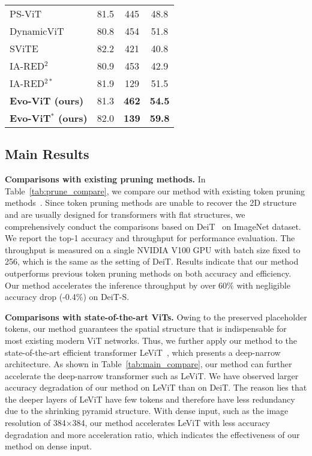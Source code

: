 \documentclass[letterpaper]{article} \usepackage{aaai22}  \usepackage{times}  \usepackage{helvet}  \usepackage{courier}  \usepackage[hyphens]{url}  \usepackage{graphicx} \urlstyle{rm} \def\UrlFont{\rm}  \usepackage{natbib}  \usepackage{caption} \DeclareCaptionStyle{ruled}{labelfont=normalfont,labelsep=colon,strut=off} \frenchspacing  \setlength{\pdfpagewidth}{8.5in}  \setlength{\pdfpageheight}{11in}  \usepackage{algorithm}
\begin{document}
\begin{table}
{{\begin{tabular}{l|ccc}
    PS-ViT~\cite{PatchSlimming}     &      81.5       &                445        &       48.8      \\
    DynamicViT~\cite{DynamicViT}    &      80.8       &                454        &       51.8      \\
    SViTE~\cite{SViTE}              &      82.2   &                 421        &       40.8      \\
    IA-RED$^2$~\cite{IA-RED2}       &      80.9       &                453        &       42.9      \\
    IA-RED$^{2*}$~\cite{IA-RED2}    &      81.9       &                129        &       51.5      \\
    \textbf{Evo-ViT (ours) }        &      81.3       &      \textbf{462}        &       \textbf{54.5} \\
    \textbf{Evo-ViT$^{*}$ (ours)}   &      82.0       &                \textbf{139}        &       \textbf{59.8}      \\
    \bottomrule
    \end{tabular}
    }
    }
    \vspace{-3mm}
\end{table} 
\subsection{Main Results}
\noindent\textbf{Comparisons with existing pruning methods.}
In Table~\ref{tab:prune_compare}, we compare our method with existing token pruning methods~\cite{DynamicViT,IA-RED2,PatchSlimming,SViTE}. Since token pruning methods are unable to recover the 2D structure and are usually designed for transformers with flat structures, we comprehensively conduct the comparisons based on DeiT~\cite{DeiT} on ImageNet dataset. We report the top-1 accuracy and throughput for performance evaluation. The throughput is measured on a single NVIDIA V100 GPU with batch size fixed to 256, which is the same as the setting of DeiT. Results indicate that our method outperforms previous token pruning methods on both accuracy and efficiency. Our method accelerates the inference throughput by over 60$\%$ with negligible accuracy drop (-0.4$\%$) on DeiT-S.

\noindent\textbf{Comparisons with state-of-the-art ViTs.}
Owing to the preserved placeholder tokens, our method guarantees the spatial structure that is indispensable for most existing modern ViT networks. Thus, we further apply our method to the state-of-the-art efficient transformer LeViT~\cite{LeViT}, which presents a deep-narrow architecture. As shown in Table~\ref{tab:main_compare}, our method can further accelerate the deep-narrow transformer such as LeViT. We have observed larger accuracy degradation of our method on LeViT than on DeiT. The reason lies that the deeper layers of LeViT have few tokens and therefore have less redundancy due to the shrinking pyramid structure. With dense input, such as the image resolution of 384×384, our method accelerates LeViT with less accuracy degradation and more acceleration ratio, which indicates the effectiveness of our method on dense input.
\end{document}
